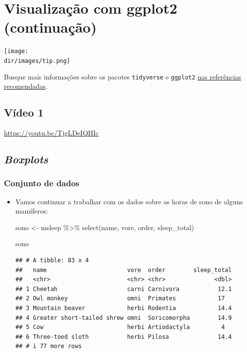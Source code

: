 \documentclass[
  11pt]{report}
\newenvironment{Shaded}{\begin{snugshade}}{\end{snugshade}}
\newcommand{\FunctionTok}[1]{\textcolor[rgb]{0.00,0.00,0.00}{#1}}
\newcommand{\NormalTok}[1]{#1}
\newcommand{\OtherTok}[1]{\textcolor[rgb]{0.56,0.35,0.01}{#1}}
\newcommand{\SpecialCharTok}[1]{\textcolor[rgb]{0.00,0.00,0.00}{#1}}
\newcommand{\dir}{/ssd/R/x86_64-pc-linux-gnu-library/4.2/fnaufelRmd/rmarkdown/resources}
\newenvironment{rmdtip}
{
  \begin{mytip}
    \texttt{[image: \\dir/images/tip.png]}
    \tcblower
  }
  {
  \end{mytip}
}
\renewenvironment{Shaded}{
    \begin{mdframed}[%
      roundcorner=2pt,%
      innerleftmargin=5pt,%
      innerrightmargin=5pt,%
      topline=true,%
      leftline=true,%
      rightline=true,%
      bottomline=true,%
      linewidth=0.5pt,%
      linecolor=black!20,%
      backgroundcolor=black!2,%
      skipabove=2ex,%
      skipbelow=2.5ex%
    ]%
  }
  {
    \end{mdframed}
  }
\begin{document}
\hypertarget{viz2}{%
\chapter{Visualização com ggplot2 (continuação)}\label{viz2}}

\begin{rmdtip}
Busque mais informações sobre os pacotes \texttt{tidyverse} e \texttt{ggplot2} \protect\hyperlink{refrec}{nas referências recomendadas}.

\end{rmdtip}

\hypertarget{vuxeddeo-1-3}{%
\section{Vídeo 1}\label{vuxeddeo-1-3}}

\begin{center} \url{https://youtu.be/TjgLDeIQHIc} \end{center}

\hypertarget{boxplots}{%
\section{\texorpdfstring{\emph{Boxplots}}{Boxplots}}\label{boxplots}}

\hypertarget{conjunto-de-dados}{%
\subsection{Conjunto de dados}\label{conjunto-de-dados}}

\begin{itemize}
\item
  Vamos continuar a trabalhar com os dados sobre as horas de sono de alguns mamíferos:

\begin{Shaded}
\begin{Highlighting}[]
\NormalTok{sono }\OtherTok{\textless{}{-}}\NormalTok{ msleep }\SpecialCharTok{\%\textgreater{}\%} 
  \FunctionTok{select}\NormalTok{(name, vore, order, sleep\_total)}

\NormalTok{sono}
\end{Highlighting}
\end{Shaded}

\begin{verbatim}
## # A tibble: 83 x 4
##   name                       vore  order        sleep_total
##   <chr>                      <chr> <chr>              <dbl>
## 1 Cheetah                    carni Carnivora           12.1
## 2 Owl monkey                 omni  Primates            17  
## 3 Mountain beaver            herbi Rodentia            14.4
## 4 Greater short-tailed shrew omni  Soricomorpha        14.9
## 5 Cow                        herbi Artiodactyla         4  
## 6 Three-toed sloth           herbi Pilosa              14.4
## # i 77 more rows
\end{verbatim}
\end{itemize}
\end{document}
